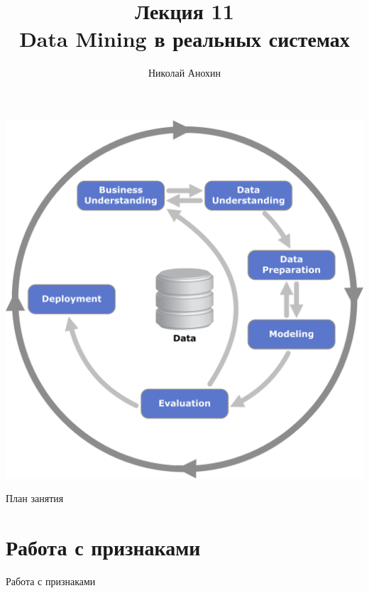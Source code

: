 \documentclass[aspectratio=169]{beamer}
\author{Николай Анохин}
\title{\newline \newline \newline Лекция 11 \\ Data Mining в реальных системах}
\let\otp\titlepage
\renewcommand{\titlepage}{\otp\addtocounter{framenumber}{-1}}
\begin{document}
\begin{frame}[plain]
\titlepage
\end{frame}

\begin{frame}{}

\begin{center}
\includegraphics[scale=0.4]{images/crisp.png}
\end{center}

\end{frame}

\begin{frame}{План занятия}
\tableofcontents
\end{frame}


\section{Работа с признаками}


\begin{frame}{}

\begin{center}
\Large Работа с признаками
\end{center}

\end{frame}
\end{document}
